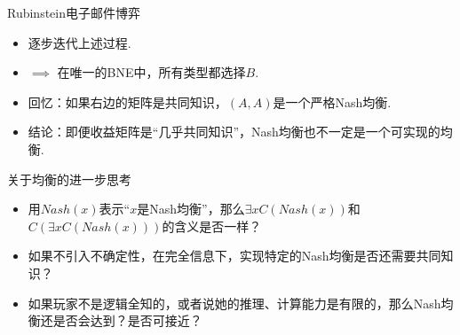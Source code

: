 \begin{frame}{Rubinstein电子邮件博弈}
\begin{itemize}
\item 逐步迭代上述过程. 
\item $\implies$ 在唯一的BNE中，所有类型都选择$B$. 
\item 回忆：如果右边的矩阵是共同知识，$(A,A)$是一个严格Nash均衡. 
\item 结论：即便收益矩阵是“几乎共同知识”，Nash均衡也不一定是一个可实现的均衡. 
\end{itemize}
\end{frame}

\begin{frame}{关于均衡的进一步思考}
\begin{itemize}
    \item 用$Nash(x)$表示“$x$是Nash均衡”，那么$\exists x C(Nash(x))$和$C(\exists x C(Nash(x)))$的含义是否一样？
    \item 如果不引入不确定性，在完全信息下，实现特定的Nash均衡是否还需要共同知识？
    \item 如果玩家不是逻辑全知的，或者说她的推理、计算能力是有限的，那么Nash均衡还是否会达到？是否可接近？
\end{itemize}
\end{frame}
